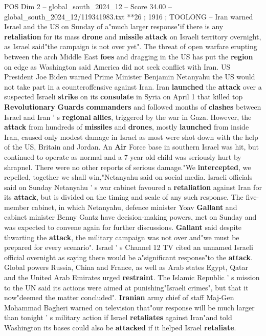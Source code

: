 \begin{textsample}{POS Dim 2 – global\_south\_2024\_12 – Score 34.00 – global\_south\_2024\_12/119341983.txt}  \label{ex:f2_pos_201}
**26 ; 1916 ; TOOLONG -- Iran warned Israel and the US on Sunday of a"much larger response"if there is any \textbf{retaliation} for its mass \textbf{drone} and \textbf{missile} \textbf{attack} on Israeli territory overnight, as Israel said"the campaign is not over yet".
The threat of open warfare erupting between the arch Middle East \textbf{foes} and dragging in the US has put the \textbf{region} on edge as Washington said America did not seek conflict with Iran.
US President Joe Biden warned Prime Minister Benjamin Netanyahu the US would not take part in a counteroffensive against Iran.
Iran \textbf{launched} the \textbf{attack} over a suspected Israeli \textbf{strike} on its \textbf{consulate} in Syria on April 1 that killed top \textbf{Revolutionary} \textbf{Guards} \textbf{commanders} and followed months of \textbf{clashes} between Israel and Iran ' s \textbf{regional} \textbf{allies}, triggered by the war in Gaza.
However, the \textbf{attack} from hundreds of \textbf{missiles} and \textbf{drones}, mostly \textbf{launched} from inside Iran, caused only modest damage in Israel as most were shot down with the help of the US, Britain and Jordan.
An \textbf{Air} Force base in southern Israel was hit, but continued to operate as normal and a 7-year old child was seriously hurt by shrapnel.
There were no other reports of serious damage."We \textbf{intercepted}, we repelled, together we shall win,"Netanyahu said on social media.
Israeli officials said on Sunday Netanyahu ' s war cabinet favoured a \textbf{retaliation} against Iran for its \textbf{attack}, but is divided on the timing and scale of any such response.
The five-member cabinet, in which Netanyahu, defence minister Yoav \textbf{Gallant} and cabinet minister Benny Gantz have decision-making powers, met on Sunday and was expected to convene again for further discussions. \textbf{Gallant} said despite thwarting the \textbf{attack}, the military campaign was not over and"we must be prepared for every scenario".
Israel ' s Channel 12 TV cited an unnamed Israeli official overnight as saying there would be a"significant response"to the \textbf{attack}.
Global powers Russia, China and France, as well as Arab states Egypt, Qatar and the United Arab Emirates urged \textbf{restraint}.
The Islamic Republic ' s mission to the UN said its actions were aimed at punishing"Israeli crimes", but that it now"deemed the matter concluded". \textbf{Iranian} army chief of staff Maj-Gen Mohammad Bagheri warned on television that"our response will be much larger than tonight ' s military action if Israel \textbf{retaliates} against Iran"and told Washington its bases could also be \textbf{attacked} if it helped Israel \textbf{retaliate}.

\end{textsample}
